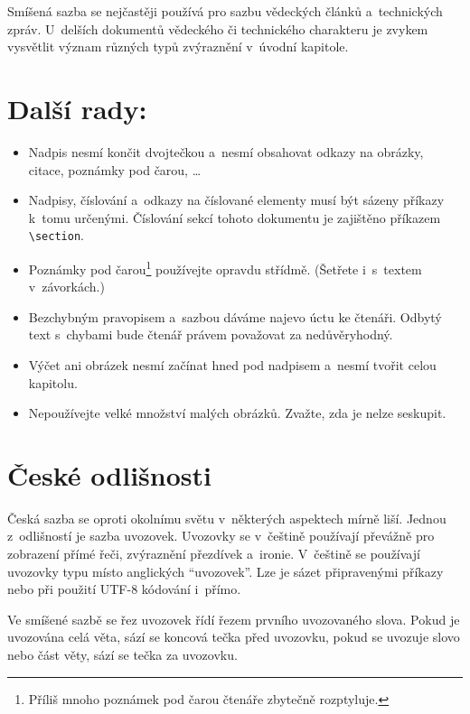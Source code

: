 \documentclass[10pt, a4paper, twocolumn]{article}
\begin{document}
Smíšená sazba se nejčastěji používá pro sazbu vědeckých článků a~technických zpráv.
U~delších dokumentů vědeckého či technického charakteru je zvykem vysvětlit význam různých typů zvýraznění v~úvodní kapitole.


\section{Další rady:}
\label{section:3}
\begin{itemize}
    \item Nadpis nesmí končit dvojtečkou a~nesmí obsahovat odkazy na obrázky, citace, poznámky pod čarou, \dots

    \item Nadpisy, číslování a~odkazy na číslované elementy musí být sázeny příkazy k~tomu určenými. Číslování sekcí tohoto dokumentu je zajištěno příkazem \texttt{\textbackslash section}.

    \item Poznámky pod čarou\footnote{Příliš mnoho poznámek pod čarou čtenáře zbytečně rozptyluje.} používejte opravdu střídmě. (Šetřete i~s~textem v~závorkách.)

    \item Bezchybným pravopisem a~sazbou dáváme najevo úctu ke čtenáři. Odbytý text s~chybami bude čtenář právem považovat za nedůvěryhodný.

    \item Výčet ani obrázek nesmí začínat hned pod nadpisem a~nesmí tvořit celou kapitolu.

    \item Nepoužívejte velké množství malých obrázků. Zvažte, zda je nelze seskupit.
\end{itemize}

\section{České odlišnosti}

Česká sazba se oproti okolnímu světu v~některých aspektech mírně liší.
Jednou z~odlišností je sazba uvozovek.
Uvozovky se v~češtině používají převážně pro zobrazení přímé řeči, zvýraznění přezdívek a~ironie.
V~češtině se používají uvozovky typu  místo anglických “uvozovek”.
Lze je sázet připravenými příkazy nebo při použití UTF-8 kódování i~přímo.

Ve smíšené sazbě se řez uvozovek řídí řezem prvního uvozovaného slova.
Pokud je uvozována celá věta, sází se koncová tečka před uvozovku, pokud se uvozuje slovo nebo část věty, sází se tečka za uvozovku.
\end{document}
